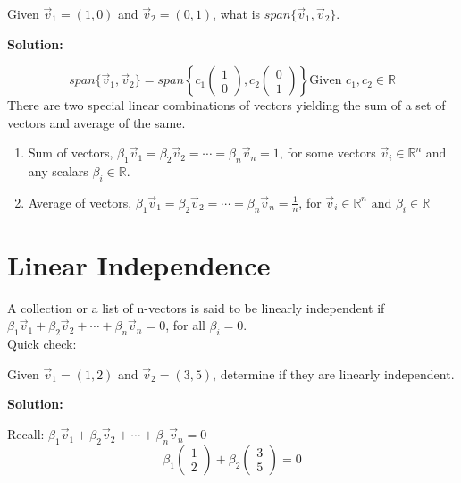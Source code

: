 \documentclass[11pt]{article}
\begin{document}
Given $\vec v_ 1 = (1, 0)$ and $\vec v_2 = (0, 1)$, what is $span\{\vec v_1, \vec v_2\}$.

\vspace{0.15in}
\begin{center}
\textbf{Solution:}
\end{center}
\[
span\{\vec v_1, \vec v_2 \} = span\left\{c_1\begin{pmatrix}
1 \\0
\end{pmatrix},
c_2 \begin{pmatrix}
0 \\ 1
\end{pmatrix} \right\}\text{Given } c_1, c_ 2\in \mathbb{R}
\]
There are two special linear combinations of vectors yielding the sum of a set of vectors and average of the same.
\begin{enumerate}
\item Sum of vectors, $\beta_1 \vec v_1 = \beta_2 \vec v_2  = \cdots =\beta_n \vec v_n = 1$, for some vectors $\vec v_i \in \mathbb{R}^n$ and any scalars $\beta_i \in \mathbb{R}$.
\item Average of vectors, $\beta_1 \vec v_1 = \beta_2 \vec v_2 = \cdots = \beta_n \vec v_n = \frac{1}{n}$, for $\vec v_i \in \mathbb{R}^n  \text{ and } \beta_i \in \mathbb{R}$
\end{enumerate}
\section{Linear Independence}
A collection or a list of n-vectors is said to be linearly independent if $\beta_1 \vec v_1 + \beta_2 \vec v_2 + \cdots + \beta_n \vec v_n = 0$, for all $\beta_i  = 0$.\\[0.1in]
Quick check:

Given $\vec v_1  = (1,2)$ and $\vec v_2 = (3, 5)$, determine if they are linearly independent.

\vspace{0.15in}
\begin{center}
\textbf{Solution:}
\end{center}
Recall: $\beta_1 \vec v_1 +\beta_2 \vec v_2+  \cdots + \beta_n \vec v_n = 0$
\[
\beta_1 \begin{pmatrix}
1 \\ 2
\end{pmatrix} + \beta_2 \begin{pmatrix}
3 \\ 5
\end{pmatrix}
= 0
\]
\end{document}
